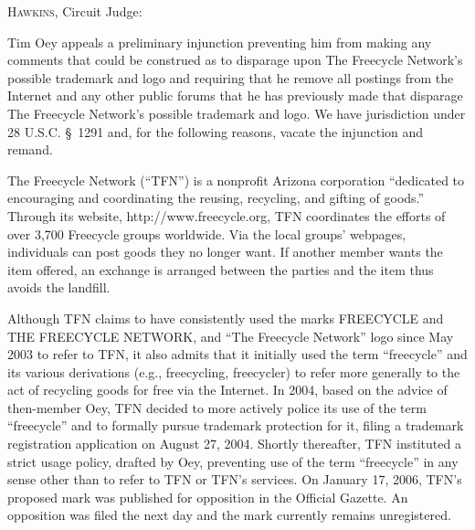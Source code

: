 
\opinion \textsc{Hawkins}, Circuit Judge:

Tim Oey appeals a preliminary injunction preventing him from making any
comments that could be construed as to disparage upon The Freecycle Network's
possible trademark and logo and requiring that he remove all postings from
the Internet and any other public forums that he has previously made that
disparage The Freecycle Network's possible trademark and
logo. We have jurisdiction under 28 U.S.C. \S~1291 and, for the following
reasons, vacate the injunction and remand.




The Freecycle Network (``TFN'') is a nonprofit Arizona corporation ``dedicated
to encouraging and coordinating the reusing, recycling, and gifting of goods.''
Through its website, http://www.freecycle.org, TFN coordinates the efforts
of over 3,700 Freecycle groups worldwide. Via the local groups' webpages,
individuals can post goods they no longer want. If another member wants the item
offered, an exchange is arranged between the parties and the item thus avoids
the landfill.

Although TFN claims to have consistently used the marks FREECYCLE and THE
FREECYCLE NETWORK, and ``The Freecycle Network'' logo since May 2003 to refer to
TFN, it also admits that it initially used the term ``freecycle'' and its
various derivations (e.g., freecycling, freecycler) to refer more generally to
the act of recycling goods for free via the Internet. In 2004, based on the
advice of then-member  Oey, TFN decided to more actively police its use of the
term ``freecycle'' and to formally pursue trademark protection for it, filing a
trademark registration application on August 27, 2004. Shortly thereafter, TFN
instituted a strict usage policy, drafted by Oey, preventing use of the term
``freecycle'' in any sense other than to refer to TFN or TFN's services. On
January 17, 2006, TFN's proposed mark was published for opposition in the
Official Gazette. An opposition was filed the next day and the mark currently
remains unregistered.

